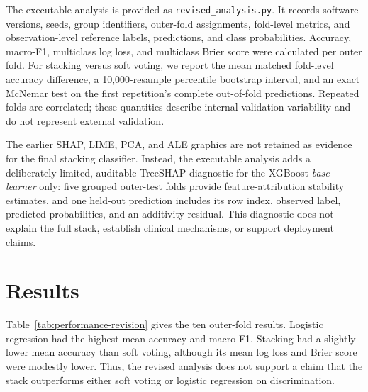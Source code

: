 The executable analysis is provided as \texttt{revised\_analysis.py}. It records software versions, seeds, group identifiers, outer-fold assignments, fold-level metrics, and observation-level reference labels, predictions, and class probabilities. Accuracy, macro-F1, multiclass log loss, and multiclass Brier score were calculated per outer fold. For stacking versus soft voting, we report the mean matched fold-level accuracy difference, a 10,000-resample percentile bootstrap interval, and an exact McNemar test on the first repetition's complete out-of-fold predictions. Repeated folds are correlated; these quantities describe internal-validation variability and do not represent external validation.

The earlier SHAP, LIME, PCA, and ALE graphics are not retained as evidence for the final stacking classifier. Instead, the executable analysis adds a deliberately limited, auditable TreeSHAP diagnostic for the XGBoost \emph{base learner} only: five grouped outer-test folds provide feature-attribution stability estimates, and one held-out prediction includes its row index, observed label, predicted probabilities, and an additivity residual. This diagnostic does not explain the full stack, establish clinical mechanisms, or support deployment claims.

\section{Results}
\label{sec:results-revision}

Table~\ref{tab:performance-revision} gives the ten outer-fold results. Logistic regression had the highest mean accuracy and macro-F1. Stacking had a slightly lower mean accuracy than soft voting, although its mean log loss and Brier score were modestly lower. Thus, the revised analysis does not support a claim that the stack outperforms either soft voting or logistic regression on discrimination.


